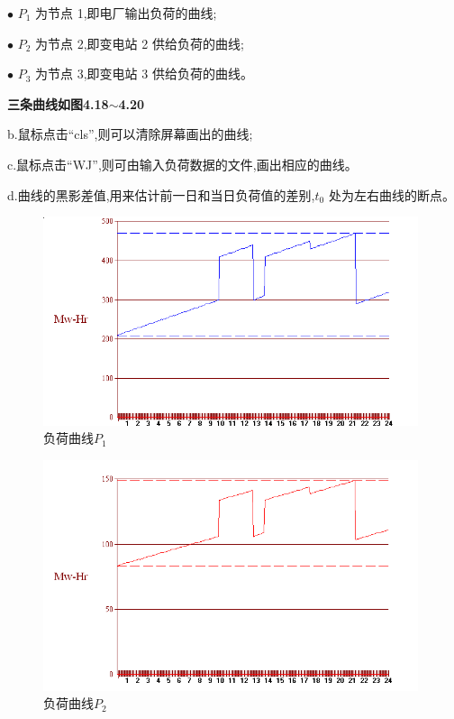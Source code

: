 \documentclass[a4paper]{ctexrep}
\begin{document}
                    \qquad \quad $\bullet$ \quad $P_1$ 为节点 1,即电厂输出负荷的曲线;

                    \qquad \quad $\bullet$ \quad $P_2$ 为节点 2,即变电站 2 供给负荷的曲线;

                    \qquad \quad $\bullet$ \quad $P_3$ 为节点 3,即变电站 3 供给负荷的曲线。

                    \qquad \textbf{三条曲线如图4.18$\sim$4.20}

                    \qquad b.鼠标点击“cls”,则可以清除屏幕画出的曲线;

                    \qquad c.鼠标点击“WJ”,则可由输入负荷数据的文件,画出相应的曲线。

                    \qquad d.曲线的黑影差值,用来估计前一日和当日负荷值的差别,$t_0$ 处为左右曲线的断点。

                    \begin{figure}[htbp]
                        \centering
                        \includegraphics[width=11cm]{27.png} 
                        \caption{负荷曲线$P_1$}
                    \end{figure}

                    \begin{figure}[htbp]
                        \centering
                        \includegraphics[width=11cm]{28.png} 
                        \caption{负荷曲线$P_2$}
                    \end{figure}
\end{document}
